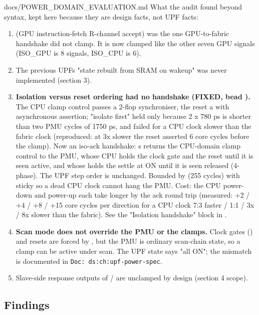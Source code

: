 \begin{relocated}{docs/POWER_DOMAIN_EVALUATION.md}
What the audit found beyond syntax, kept here because they are design
facts, not UPF facts:

\begin{enumerate}
\def\labelenumi{\arabic{enumi}.}
\tightlist
\item
   (GPU instruction-fetch R-channel accept) was
  the one GPU-to-fabric handshake  did not clamp. It is
  now clamped like the other seven GPU signals (ISO\_GPU is 8 signals,
  ISO\_CPU is 6).
\item
  The previous UPF\textquotesingle s "state rebuilt from SRAM on wakeup"
  was never implemented (section 3).
\item
  \textbf{Isolation versus reset ordering had no handshake (FIXED, bead
  ).} The CPU clamp control passes a 2-flop synchroniser, the
  reset a  with asynchronous assertion; "isolate
  first" held only because 2 x 780 ps is shorter than two PMU cycles of
  1750 ps, and failed for a CPU clock slower than the fabric clock
  (reproduced: at 3x slower the reset asserted 6 core cycles before the
  clamp). Now an iso-ack handshake: \textquotesingle s
   returns the CPU-domain clamp control to the
  PMU, whose CPU  holds the clock gate and the reset
  until it is seen active, and whose  holds the settle
  at ON until it is seen released (4-phase). The UPF step order is
  unchanged. Bounded by  (255 cycles) with sticky
   so a dead CPU clock cannot hang the PMU. Cost: the
  CPU power-down and power-up each take longer by the ack round trip
  (measured: +2 / +4 / +8 / +15 core cycles per direction for a CPU
  clock 7:3 faster / 1:1 / 3x / 8x slower than the fabric). See the
  "Isolation handshake" block in .
\item
  \textbf{Scan mode does not override the PMU or the clamps.} Clock
  gates () and resets are forced by ,
  but the PMU is ordinary scan-chain state, so a clamp can be active
  under scan. The UPF  state says "all ON"; the mismatch is
  documented in
  \texttt{Doc:\allowbreak{}\ ds:\allowbreak{}ch:\allowbreak{}upf-\allowbreak{}power-\allowbreak{}spec}.
\item
  Slave-side response outputs of  /  are
  unclamped by design (section 4 scope).
\end{enumerate}

\subsection{Findings}\label{tm:pd:power-domain-evaluation:1-findings}


\end{relocated}
